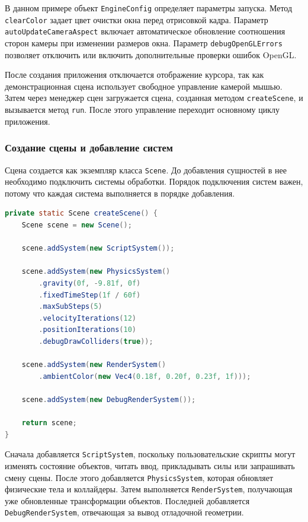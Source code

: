 В данном примере объект \texttt{EngineConfig} определяет параметры запуска. Метод \texttt{clearColor} задает цвет очистки окна перед отрисовкой кадра. Параметр \texttt{autoUpdateCameraAspect} включает автоматическое обновление соотношения сторон камеры при изменении размеров окна. Параметр \texttt{debugOpenGLErrors} позволяет отключить или включить дополнительные проверки ошибок OpenGL.

После создания приложения отключается отображение курсора, так как демонстрационная сцена использует свободное управление камерой мышью. Затем через менеджер сцен загружается сцена, созданная методом \texttt{createScene}, и вызывается метод \texttt{run}. После этого управление переходит основному циклу приложения.

\subsubsection{Создание сцены и добавление систем}

Сцена создается как экземпляр класса \texttt{Scene}. До добавления сущностей в нее необходимо подключить системы обработки. Порядок подключения систем важен, потому что каждая система выполняется в порядке добавления.

\begin{lstlisting}[language=Java,caption={Создание сцены и подключение систем}]
private static Scene createScene() {
    Scene scene = new Scene();

    scene.addSystem(new ScriptSystem());

    scene.addSystem(new PhysicsSystem()
        .gravity(0f, -9.81f, 0f)
        .fixedTimeStep(1f / 60f)
        .maxSubSteps(5)
        .velocityIterations(12)
        .positionIterations(10)
        .debugDrawColliders(true));

    scene.addSystem(new RenderSystem()
        .ambientColor(new Vec4(0.18f, 0.20f, 0.23f, 1f)));

    scene.addSystem(new DebugRenderSystem());

    return scene;
}
\end{lstlisting}

Сначала добавляется \texttt{ScriptSystem}, поскольку пользовательские скрипты могут изменять состояние объектов, читать ввод, прикладывать силы или запрашивать смену сцены. После этого добавляется \texttt{PhysicsSystem}, которая обновляет физические тела и коллайдеры. Затем выполняется \texttt{RenderSystem}, получающая уже обновленные трансформации объектов. Последней добавляется \texttt{DebugRenderSystem}, отвечающая за вывод отладочной геометрии.

